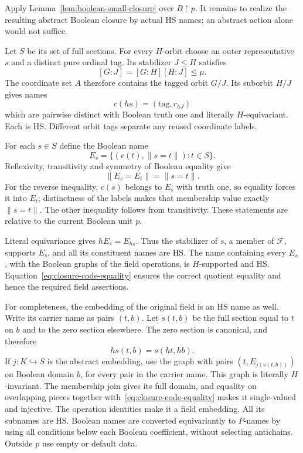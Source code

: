 \documentclass[11pt,a4paper]{article}
\theoremstyle{definition}\newtheorem{definition}[theorem]{Definition}
\theoremstyle{remark}\newtheorem{remark}[theorem]{Remark}
\begin{document}
Apply Lemma~\ref{lem:boolean-small-closure} over $B\mathbin{\upharpoonright}p$. It remains to realize the resulting abstract Boolean closure by actual HS names; an abstract action alone would not suffice.

Let $S$ be its set of full sections. For every $H$-orbit choose an outer representative $s$ and a distinct pure ordinal tag. Its stabilizer $J\leq H$ satisfies
\[
[G:J]=[G:H][H:J]\leq\mu.
\]
The coordinate set $A$ therefore contains the tagged orbit $G/J$. Its suborbit $H/J$ gives names
\[
c(hs)=(\text{tag},r_{hJ})
\]
which are pairwise distinct with Boolean truth one and literally $H$-equivariant. Each is HS. Different orbit tags separate any reused coordinate labels.

For each $s\in S$ define the Boolean name
\[
E_s=\{(c(t),\lVert s=t\rVert):t\in S\}.
\]
Reflexivity, transitivity and symmetry of Boolean equality give
\begin{equation}\label{eq:closure-code-equality}
\lVert E_s=E_t\rVert=\lVert s=t\rVert.
\end{equation}
For the reverse inequality, $c(s)$ belongs to $E_s$ with truth one, so equality forces it into $E_t$; distinctness of the labels makes that membership value exactly $\lVert s=t\rVert$. The other inequality follows from transitivity. These statements are relative to the current Boolean unit $p$.

Literal equivariance gives $hE_s=E_{hs}$. Thus the stabilizer of $s$, a member of $\mathcal F$, supports $E_s$, and all its constituent names are HS. The name containing every $E_s$, with the Boolean graphs of the field operations, is $H$-supported and HS. Equation~\eqref{eq:closure-code-equality} ensures the correct quotient equality and hence the required field assertions.

For completeness, the embedding of the original field is an HS name as well. Write its carrier name as pairs $(t,b)$. Let $s(t,b)$ be the full section equal to $t$ on $b$ and to the zero section elsewhere. The zero section is canonical, and therefore
\[
hs(t,b)=s(ht,hb).
\]
If $j:K\hookrightarrow S$ is the abstract embedding, use the graph with pairs $(t,E_{j(s(t,b))})$ on Boolean domain $b$, for every pair in the carrier name. This graph is literally $H$-invariant. The membership join gives its full domain, and equality on overlapping pieces together with~\eqref{eq:closure-code-equality} makes it single-valued and injective. The operation identities make it a field embedding. All its subnames are HS. Boolean names are converted equivariantly to $P$-names by using all conditions below each Boolean coefficient, without selecting antichains. Outside $p$ use empty or default data.
\end{document}

